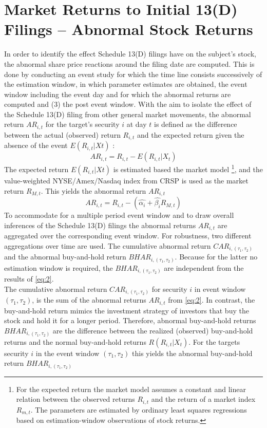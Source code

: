 \documentclass[12pt]{article}
\begin{document}
\section{Market Returns to Initial 13(D) Filings -- Abnormal Stock Returns}
In order to identify the effect Schedule 13(D) filings have on the subject's stock, the abnormal share price reactions around the filing date are computed. This is done by conducting an event study for which the time line consists successively of the estimation window, in which parameter estimates are obtained, the event window including the event day and for which the abnormal returns are computed and (3) the post event window.  
With the aim to isolate the effect of the Schedule 13(D) filing from other general market movements, the abnormal return $AR_{i,t}$ for the target's security $i$ at day $t$ is defined as the difference between the actual (observed) return $R_{i,t}$ and the expected return given the absence of the event $E(R_{i,t}|X{t})$ :
	\begin{equation}\label{eq:1}
		AR_{i,t}=R_{i,t}-E(R_{i,t}|X_{t})
	\end{equation}
The expected return $E(R_{i,t}|X{t})$ is estimated based the market model 
	\footnote{For the expected return the market model assumes a constant and linear relation between the observed returns $R_{i,t}$ and the return of a market index $R_{m,t}$. The parameters are estimated by ordinary least squares regressions based on estimation-window observations of stock returns.}, 
and the value-weighted NYSE/Amex/Nasdaq index from CRSP is used as the market return $R_{M,t}$.
This yields the abnormal return $AR_{i,t}$
\begin{equation}\label{eq:2}
	AR_{i,t}=R_{i,t}-(\hat{\alpha_{i}}+\hat{\beta_{i}}R_{M,t})
\end{equation}
To accommodate for a multiple period event window and to draw overall inferences of the Schedule 13(D) filings \citep{MacKinlay1997} the abnormal returns $AR_{i,t}$ are aggregated over the corresponding event window. For robustness, two different aggregations over time are used. The cumulative abnormal return $CAR_{i,(\tau_1,\tau_2)}$ and the abnormal buy-and-hold return $BHAR_{i,(\tau_1,\tau_2)}$. Because for the latter no estimation window is required, the $BHAR_{i,(\tau_1,\tau_2)}$ are independent from the results of \eqref{eq:2}.\\
The cumulative abnormal return $CAR_{i,(\tau_1,\tau_2)}$ for security $i$ in event window $(\tau_1,\tau_2)$, is the sum of the abnormal returns $AR_{i,t}$ from \eqref{eq:2}. In contrast, the buy-and-hold return mimics the investment strategy of investors that buy the stock and hold it for a longer period. Therefore, abnormal buy-and-hold returns $BHAR_{i,(\tau_1,\tau_2)}$ are the difference between the realized (observed) buy-and-hold returns and the normal buy-and-hold returns $R(R_{i,t}|X_{t})$. For the targets security $i$ in the event window $(\tau_1,\tau_2)$ this yields the abnormal buy-and-hold return $BHAR_{i,(\tau_1,\tau_2)}$
\end{document}
